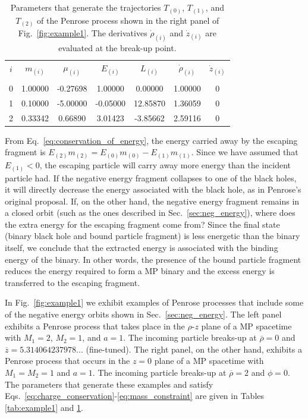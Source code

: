 \begin{table}[h]
  \centering
  \begin{tabular}{ccccccc}
    \hline\hline
    $i$ & $m_{(i)}$ & $\mu_{(i)}$ & $E_{(i)}$ & $L_{(i)}$ & $\dot{\rho}_{(i)}$ & $\dot{z}_{(i)}$ \\ \vspace{-0.3cm} \\
    0   & 1.00000   & -0.27698    & 1.00000   & 0.00000   & 1.00000            & 0               \\
    1   & 0.10000   & -5.00000    & -0.05000  & 12.85870  & 1.36059            & 0               \\
    2   & 0.33342   & 0.66890     & 3.01423   & -3.85662  & 2.59116            & 0               \\
    \hline\hline
  \end{tabular}
  \caption{Parameters that generate the trajectories $T_{(0)}$, $T_{(1)}$, and $T_{(2)}$ of the Penrose process shown in the right panel of Fig.~\ref{fig:example1}. The derivatives $\dot{\rho}_{(i)}$ and $\dot{z}_{(i)}$ are evaluated at the break-up point.}
  \label{tab:example2}
\end{table}

From Eq.~\eqref{eq:conservation_of_energy}, the energy carried away by the escaping fragment is $E_{(2)}m_{(2)} = E_{(0)}m_{(0)} - E_{(1)}m_{(1)}$. Since we have assumed that $E_{(1)} < 0$, the escaping particle will carry away more energy than the incident particle had. If the negative energy fragment collapses to one of the black holes, it will directly decrease the energy associated with the black hole, as in Penrose's original proposal. If, on the other hand, the negative energy fragment remains in a closed orbit (such as the ones described in Sec.~\ref{sec:neg_energy}), where does the extra energy for the escaping fragment come from? Since the final state (binary black hole and bound particle fragment) is less energetic than the binary itself, we conclude that the extracted energy is associated with the binding energy of the binary. In other words, the presence of the bound particle fragment reduces the energy required to form a MP binary and the excess energy is transferred to the escaping fragment.


In Fig.~\ref{fig:example1} we exhibit examples of Penrose processes that include some of the negative energy orbits shown in Sec.~\ref{sec:neg_energy}. The left panel exhibits a Penrose process that takes place in the $\rho$-$z$ plane of a MP spacetime with $M_1=2$, $M_2=1$, and $a=1$. The incoming particle breaks-up at $\overline \rho=0$ and $\overline z = 5.314064237978...$ (fine-tuned). The right panel, on the other hand,  exhibits a Penrose process that occurs in the $z=0$ plane of a MP spacetime with $M_1=M_2=1$ and $a=1$. The incoming particle breaks-up at $\overline \rho=2$ and $\phi = 0$. The parameters that generate these examples and satisfy Eqs.~\eqref{eq:charge_conservation}-\eqref{eq:mass_constraint} are given in Tables \ref{tab:example1} and \ref{tab:example2}.


